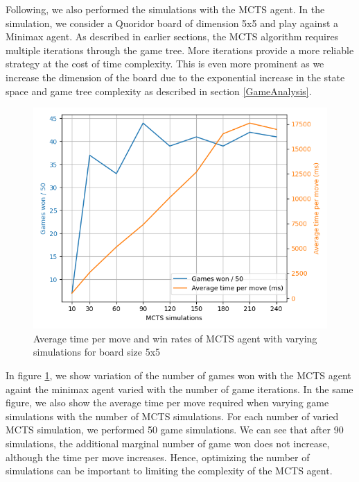 Following, we also performed the simulations with the \gls{MCTS} agent. In the simulation, we consider a Quoridor board of dimension 5x5 and play against a Minimax agent. As described in earlier sections, the \gls{MCTS} algorithm requires multiple iterations through the game tree. More iterations provide a more reliable strategy at the cost of time complexity. This is even more prominent as we increase the dimension of the board due to the exponential increase in the state space and game tree complexity as described in section \ref{GameAnalysis}.

\begin{figure}[!ht]
    \centering
    \includegraphics[width=0.7\linewidth]{../img/mcts_simulation_grid_search.png}
    \caption{Average time per move and win rates of MCTS agent with varying simulations for board size 5x5}
    \label{fig:mcts_simulations}
\end{figure}

In figure \ref{fig:mcts_simulations}, we show variation of the number of games won with the \gls{MCTS} agent againt the minimax agent varied with the number of game iterations. In the same figure, we also show the average time per move required when varying game simulations with the number of \gls{MCTS} simulations. For each number of varied \gls{MCTS} simulation, we performed 50 game simulations. We can see that after 90 simulations, the additional marginal number of game won does not increase, although the time per move increases. Hence, optimizing the number of simulations can be important to limiting the complexity of the \gls{MCTS} agent.

